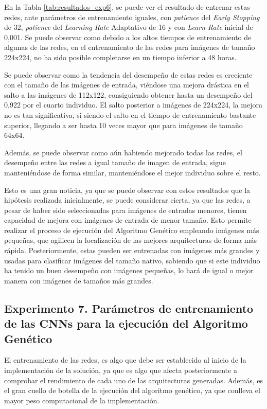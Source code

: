 En la Tabla \ref{tab:resultados_exp6}, se puede ver el resultado de entrenar estas redes, ante parámetros de entrenamiento iguales, con \textit{patience} del \textit{Early Stopping} de 32, \textit{patience} del \textit{Learning Rate} Adaptativo de 16 y con \textit{Learn Rate} inicial de 0,001. Se puede observar como debido a los altos tiempos de entrenamiento de algunas de las redes, en el entrenamiento de las redes para imágenes de tamaño 224x224, no ha sido posible completarse en un tiempo inferior a 48 horas.

Se puede observar como la tendencia del desempeño de estas redes es creciente con el tamaño de las imágenes de entrada, viéndose una mejora drástica en el salto a las imágenes de 112x122, consiguiendo obtener hasta un desempeño del 0,922 por el cuarto individuo. El salto posterior a imágenes de 224x224, la mejora no es tan significativa, si siendo el salto en el tiempo de entrenamiento bastante superior, llegando a ser hasta 10 veces mayor que para imágenes de tamaño 64x64.

Además, se puede observar como aún habiendo mejorado todas las redes, el desempeño entre las redes a igual tamaño de imagen de entrada, sigue manteniéndose de forma similar, manteniéndose el mejor individuo sobre el resto.

Esto es una gran noticia, ya que se puede observar con estos resultados que la hipótesis realizada inicialmente, se puede considerar cierta, ya que las redes, a pesar de haber sido seleccionadas para imágenes de entradas menores, tienen capacidad de mejora con imágenes de entrada de menor tamaño. Esto permite realizar el proceso de ejecución del Algoritmo Genético empleando imágenes más pequeñas, que agilicen la localización de las mejores arquitecturas de forma más rápida. Posteriormente, estas pueden ser entrenadas con imágenes más grandes y usadas para clasificar imágenes del tamaño nativo, sabiendo que si este individuo ha tenido un buen desempeño con imágenes pequeñas, lo hará de igual o mejor manera con imágenes de tamaños más grandes.

\subsection{Experimento 7. Parámetros de entrenamiento de las CNNs para la ejecución del Algoritmo Genético}

El entrenamiento de las redes, es algo que debe ser establecido al inicio de la implementación de la solución, ya que es algo que afecta posteriormente a comprobar el rendimiento de cada uno de las arquitecturas generadas. Además, es el gran cuello de botella de la ejecución del algoritmo genético, ya que conlleva el mayor peso computacional de la implementación.

